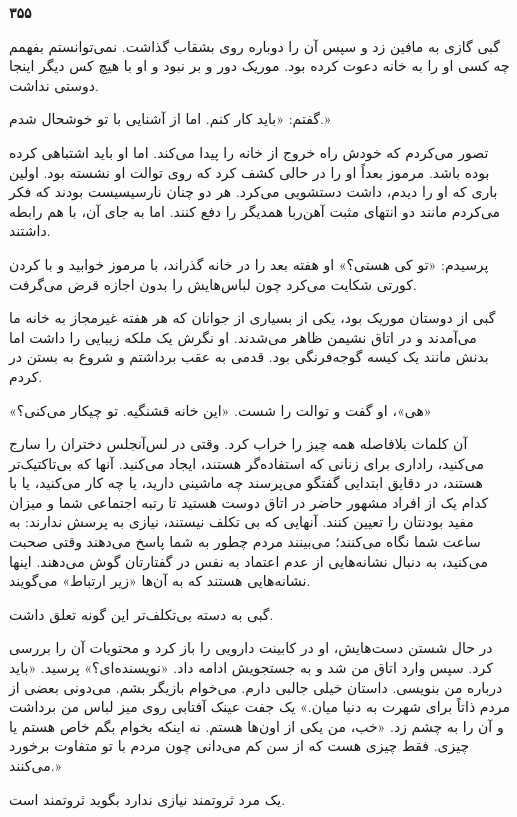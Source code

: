 \textbf{۳۵۵}

گبی گازی به مافین زد و سپس آن را دوباره روی بشقاب گذاشت. نمی‌توانستم بفهمم چه کسی او را به خانه دعوت کرده بود. موریک دور و بر نبود و او با هیچ کس دیگر اینجا دوستی نداشت.

گفتم: «باید کار کنم. اما از آشنایی با تو خوشحال شدم.»

تصور می‌کردم که خودش راه خروج از خانه را پیدا می‌کند. اما او باید اشتباهی کرده بوده باشد. مرموز بعداً او را در حالی کشف کرد که روی توالت او نشسته بود. اولین باری که او را دیدم، داشت دستشویی می‌کرد. هر دو چنان نارسیسیست بودند که فکر می‌کردم مانند دو انتهای مثبت آهن‌ربا همدیگر را دفع کنند. اما به جای آن، با هم رابطه داشتند.

پرسیدم: «تو کی هستی؟» او هفته بعد را در خانه گذراند، با مرموز خوابید و با کردن کورتی شکایت می‌کرد چون لباس‌هایش را بدون اجازه قرض می‌گرفت.

گبی از دوستان موریک بود، یکی از بسیاری از جوانان  که هر هفته غیرمجاز به خانه ما می‌آمدند و در اتاق نشیمن ظاهر می‌شدند. او نگرش یک ملکه زیبایی را داشت اما بدنش مانند یک کیسه گوجه‌فرنگی بود. قدمی به عقب برداشتم و شروع به بستن در کردم.

«هی»، او گفت و توالت را شست. «این خانه قشنگیه. تو چیکار می‌کنی؟»

آن کلمات بلافاصله همه چیز را خراب کرد. وقتی در لس‌آنجلس دختران را سارج می‌کنید، راداری برای زنانی که استفاده‌گر هستند، ایجاد می‌کنید. آنها که بی‌تاکتیک‌تر هستند، در دقایق ابتدایی گفتگو می‌پرسند چه ماشینی دارید، یا چه کار می‌کنید، یا با کدام یک از افراد مشهور حاضر در اتاق دوست هستید تا رتبه اجتماعی شما و میزان مفید بودنتان را تعیین کنند. آنهایی که بی‌ تکلف نیستند، نیازی به پرسش ندارند: به ساعت شما نگاه می‌کنند؛ می‌بینند مردم چطور به شما پاسخ می‌دهند وقتی صحبت می‌کنید، به دنبال نشانه‌هایی از عدم اعتماد به نفس در گفتارتان گوش می‌دهند. اینها نشانه‌هایی هستند که  به آن‌ها «زیر ارتباط» می‌گویند.

گبی به دسته بی‌تکلف‌تر این گونه تعلق داشت. 

در حال شستن دست‌هایش، او در کابینت دارویی را باز کرد و محتویات آن را بررسی کرد. سپس وارد اتاق من شد و به جستجویش ادامه داد. «نویسنده‌ای؟» پرسید. «باید درباره من بنویسی. داستان خیلی جالبی دارم. می‌خوام بازیگر بشم. می‌دونی بعضی از مردم ذاتاً برای شهرت به دنیا میان.» یک جفت عینک آفتابی روی میز لباس من برداشت و آن را به چشم زد. «خب، من یکی از اون‌ها هستم. نه اینکه بخوام بگم خاص هستم یا چیزی. فقط چیزی هست که از سن کم می‌دانی چون مردم با تو متفاوت برخورد می‌کنند.»

یک مرد ثروتمند نیازی ندارد بگوید ثروتمند است.

